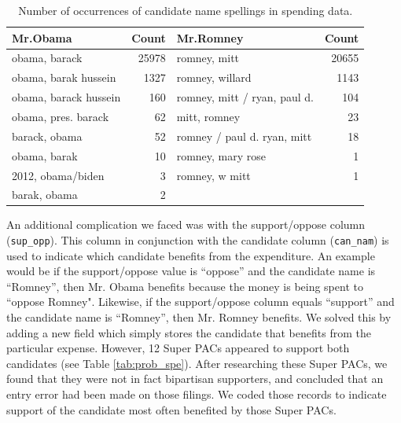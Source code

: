 \documentclass[11pt]{article}\usepackage{graphicx, color}
\begin{document}
\begin{table}[ht]
\begin{center}
\begin{tabular}{lrlr}
  \hline
Mr.Obama & Count & Mr.Romney & Count \\ 
  \hline
obama, barack & 25978 & romney, mitt & 20655 \\ 
  obama, barak hussein & 1327 & romney, willard & 1143 \\ 
  obama, barack hussein & 160 & romney, mitt / ryan, paul d. & 104 \\ 
  obama, pres. barack &  62 & mitt, romney &  23 \\ 
  barack, obama &  52 & romney / paul d. ryan, mitt &  18 \\ 
  obama, barak &  10 & romney, mary rose &   1 \\ 
  2012, obama/biden &   3 & romney, w mitt &   1 \\ 
  barak, obama &   2 &  &  \\ 
   \hline
\end{tabular}
\caption{Number of occurrences of candidate name spellings in spending data.}
\label{tab:can_nam}
\end{center}
\end{table}



An additional complication we faced was with the support/oppose column (\texttt{sup\_opp}). This column in conjunction with the candidate column (\texttt{can\_nam}) is used to indicate which candidate benefits from the expenditure. An example would be if the support/oppose value is ``oppose'' and the candidate name is ``Romney'', then Mr. Obama benefits because the money is being spent to ``oppose Romney". Likewise, if the support/oppose column equals ``support'' and the candidate name is ``Romney'', then Mr. Romney benefits. We solved this by adding a new field which simply stores the candidate that benefits from the particular expense.  However, 12 Super PACs appeared to support both candidates (see Table \ref{tab:prob_spe}). After researching these Super PACs, we found that they were not in fact bipartisan supporters, and concluded that an entry error had been made on those filings. We coded those records to indicate support of the candidate most often benefited by those Super PACs.
\end{document}
